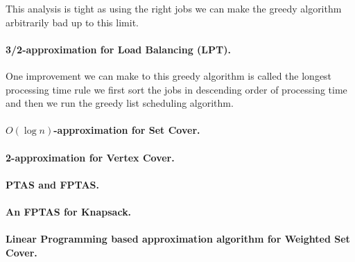 \documentclass[11pt,a4paper]{article}
\theoremstyle{definition}
\begin{document}
This analysis is tight as using the right jobs we can make the greedy algorithm arbitrarily bad up to this limit.

\paragraph{3/2-approximation for Load Balancing (LPT).}
One improvement we can make to this greedy algorithm is called the longest processing time rule we first sort the jobs in descending order of processing time and then we run the greedy list scheduling algorithm.

\paragraph{$O(\log n)$-approximation for Set Cover.}

\paragraph{2-approximation for Vertex Cover.}

\paragraph{PTAS and FPTAS.}

\paragraph{An FPTAS for Knapsack.}

\paragraph{Linear Programming based approximation algorithm for Weighted Set Cover.}
\end{document}
